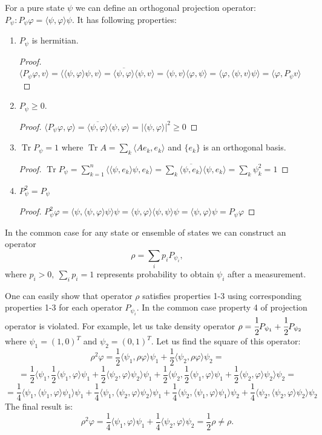 \documentclass[11pt]{article}
\DeclareMathOperator{\Tr}{Tr}
\begin{document}
For a pure state $\psi$ we can define an orthogonal projection operator: $P_\psi: P_\psi\varphi = \langle \psi, \varphi \rangle \psi$. It has following properties:
\begin{enumerate}
\item $P_\psi$ is hermitian. 
\begin{proof}
$\langle P_\psi\varphi, v\rangle = \langle \langle\psi,\varphi\rangle \psi, v\rangle = \overline{\langle\psi,\varphi\rangle} \langle\psi, v\rangle = \langle\psi, v\rangle \langle\varphi,\psi\rangle  = \langle\varphi, \langle\psi, v\rangle\psi\rangle = \langle\varphi, P_\psi v \rangle$
\end{proof}
\item $P_\psi \geq 0$.
\begin{proof}
$\langle P_\psi\varphi, \varphi\rangle = \overline{\langle\psi,\varphi\rangle} \langle\psi, \varphi\rangle = |\langle\psi, \varphi\rangle|^2 \geq 0$
\end{proof}
\item $\Tr P_\psi = 1$ where $\Tr A = \sum_k \langle Ae_k, e_k\rangle$ and $\{e_k\}$ is an orthogonal basis.
\begin{proof}
$\Tr P_\psi = \sum_{k = 1}^n \langle \langle \psi, e_k\rangle\psi, e_k\rangle = \sum_k \overline{\langle\psi, e_k\rangle}\langle\psi, e_k\rangle = \sum_k\psi_k^2 = 1$
\end{proof}
\item $P_\psi^2 = P_\psi$
\begin{proof}
$P_\psi^2\varphi = \langle\psi, \langle\psi, \varphi\rangle \psi\rangle \psi = \langle\psi, \varphi\rangle \langle\psi, \psi\rangle\psi = \langle\psi, \varphi\rangle\psi = P_\psi\varphi $
\end{proof}
\end{enumerate}
In the common case for any state or ensemble of states we can construct an operator
\[
\rho = \sum_ip_iP_{\psi_i},
\]
where $p_i > 0,\ \sum_ip_i = 1$ represents probability to obtain $\psi_i$ after a measurement.

One can easily show that operator $\rho$ satisfies properties 1-3 using corresponding properties 1-3 for each operator $P_{\psi_i}$. In the common case property 4 of projection operator is violated. For example, let us take density operator $\rho = \cfrac 12P_{\psi_1} + \cfrac 12P_{\psi_2}$ where $\psi_1 = (1, 0)^T$ and $\psi_2 = (0, 1)^T$. Let us find the square of this operator:
\[
\rho^2\varphi = \frac 12\langle\psi_1, \rho\varphi\rangle\psi_1 + \frac 12\langle\psi_2, \rho\varphi\rangle\psi_2 =
\]
\[
= \frac 12\langle\psi_1, \frac 12\langle\psi_1, \varphi\rangle\psi_1 + \frac 12\langle\psi_2, \varphi\rangle\psi_2 \rangle\psi_1 + \frac 12\langle\psi_2, \frac 12\langle\psi_1, \varphi\rangle\psi_1 + \frac 12\langle\psi_2, \varphi\rangle\psi_2 \rangle\psi_2 =
\]
\[
 = 
\frac 14\langle\psi_1, \langle\psi_1,\varphi\rangle\psi_1\rangle\psi_1 + \frac 14\langle\psi_1, \langle\psi_2,\varphi\rangle\psi_2\rangle\psi_1 +
\frac 14\langle\psi_2, \langle\psi_1,\varphi\rangle\psi_1\rangle\psi_2 + \frac 14\langle\psi_2, \langle\psi_2,\varphi\rangle\psi_2\rangle\psi_2
\]
The final result is:
\[
\rho^2\varphi = \frac 14 \langle\psi_1, \varphi\rangle\psi_1 + \frac 14\langle\psi_2, \varphi\rangle\psi_2 = \frac 12\rho \neq \rho.
\]
\end{document}
